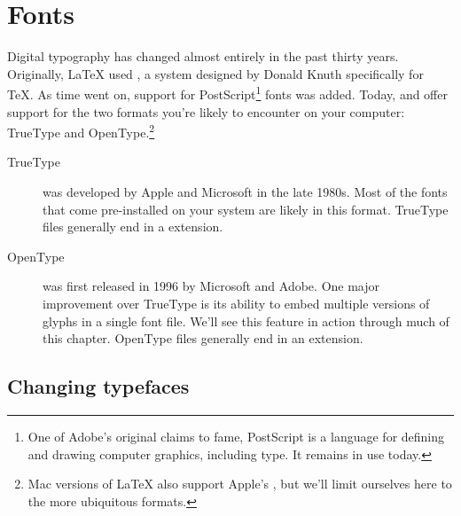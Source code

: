 \chapter{Fonts}
\label{fonts}

Digital typography has changed almost entirely in the past thirty years.
Originally, \LaTeX{} used \MF,
a system designed by Donald Knuth specifically for \TeX{}.
As time went on, support for PostScript\footnote{One of
Adobe's original claims to fame,
PostScript is a language for defining and drawing computer graphics,
including type. It remains in use today.} fonts was added.
Today, \LuaLaTeX{} and \XeLaTeX{} offer support for the two formats you're
likely to encounter on your computer:
TrueType and OpenType.\punckern\footnote{Mac versions of \LaTeX{} also support
Apple's , but we'll limit ourselves here to the more ubiquitous
formats.}

\begin{description}
\item[TrueType] was developed by Apple and Microsoft in the late 1980s.
    Most of the fonts that come pre-installed on your system are likely
    in this format.
    TrueType files generally end in a  extension.
\item[OpenType] was first released in 1996 by Microsoft and Adobe.
    One major improvement over TrueType is its ability to embed
    multiple versions of glyphs in a single font file.
    We'll see this feature in action through much of this chapter.
    OpenType files generally end in an  extension.
\end{description}

\section{Changing typefaces}


